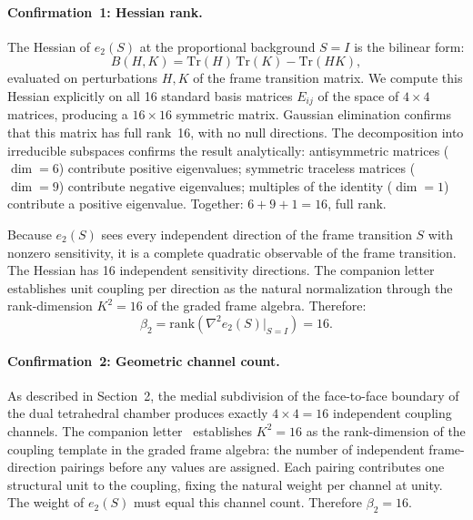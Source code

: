 \documentclass[a4paper,11pt]{article}
\begin{document}
\paragraph{Confirmation~1: Hessian rank.}
The Hessian of $e_2(S)$ at the proportional background
$S = I$ is the bilinear form:
\begin{equation}
  B(H,K) = \mathrm{Tr}(H)\,\mathrm{Tr}(K)
  - \mathrm{Tr}(HK),
\end{equation}
evaluated on perturbations $H, K$ of the frame transition
matrix. We compute this Hessian explicitly on all 16
standard basis matrices $E_{ij}$ of the space of $4\times4$
matrices, producing a $16\times16$ symmetric matrix.
Gaussian elimination confirms that this matrix has full
rank~16, with no null directions. The decomposition into
irreducible subspaces confirms the result analytically:
antisymmetric matrices ($\dim = 6$) contribute positive
eigenvalues; symmetric traceless matrices ($\dim = 9$)
contribute negative eigenvalues; multiples of the identity
($\dim = 1$) contribute a positive eigenvalue. Together:
$6 + 9 + 1 = 16$, full rank.

Because $e_2(S)$ sees every independent direction of the
frame transition $S$ with nonzero sensitivity, it is a
complete quadratic observable of the frame transition.
The Hessian has 16 independent sensitivity directions.
The companion letter~\cite{Nelson2026a} establishes unit
coupling per direction as the natural normalization through
the rank-dimension $K^2 = 16$ of the graded frame algebra.
Therefore:
\begin{equation}
  \beta_2 = \mathrm{rank}\!\left(
  \nabla^2 e_2(S)\big|_{S=I}\right) = 16.
\end{equation}

\paragraph{Confirmation~2: Geometric channel count.}
As described in Section~2, the medial subdivision of the
face-to-face boundary of the dual tetrahedral chamber
produces exactly $4 \times 4 = 16$ independent coupling
channels. The companion letter~\cite{Nelson2026a}
establishes $K^2 = 16$ as the rank-dimension of the
coupling template in the graded frame algebra: the number
of independent frame-direction pairings before any values
are assigned. Each pairing contributes one structural unit
to the coupling, fixing the natural weight per channel at
unity. The weight of $e_2(S)$ must equal this channel
count. Therefore $\beta_2 = 16$.
\end{document}
